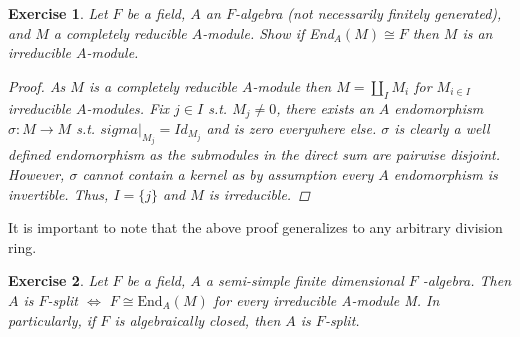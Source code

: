 \documentclass{article}
\newtheorem{exercise}{Exercise}[section]
\begin{document}
\begin{exercise}
  Let $F$ be a field, $A$ an $F$-algebra (not necessarily finitely generated), and $M$ a completely reducible $A$-module. Show if End$_{A}(M) \cong F$ then $M$ is an irreducible $A$-module.
\begin{proof}

  As $M$ is a completely reducible $A$-module then $M = \coprod_{I}M_{i}$ for $M_{i \in I}$ irreducible $A$-modules. Fix $j \in I$ s.t. $M_{j} \neq 0$, there exists an $A$ endomorphism $\sigma: M \to M$ s.t. $sigma|_{M_{j}}= Id_{M_{j}}$ and is zero everywhere else. $\sigma$ is clearly a well defined endomorphism as the submodules in the direct sum are pairwise disjoint. However, $\sigma$ cannot contain a kernel as by assumption every $A$ endomorphism is invertible. Thus, $I = \{j\}$ and $M$ is irreducible. \end{proof}
  
\end{exercise}

It is important to note that the above proof generalizes to any arbitrary division ring.
\begin{exercise}
  Let $F$ be a field, $A$ a semi-simple finite dimensional $F$ -algebra. Then $A$ is $F$-split $\iff$ $F \cong \text{End}_{A}(M)$ for every irreducible A-module M. In particularly, if $F$ is algebraically closed, then $A$ is $F$-split.
  
\end{exercise}
\end{document}
